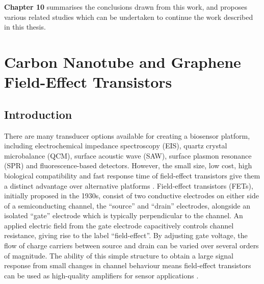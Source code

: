 \documentclass[
  a4paper,
]{scrbook}
\begin{document}
\textbf{Chapter 10} summarises the conclusions drawn from this work, and
proposes various related studies which can be undertaken to continue the
work described in this thesis.


\hypertarget{sec-thin-film-transistors}{%
\chapter{Carbon Nanotube and Graphene Field-Effect
Transistors}\label{sec-thin-film-transistors}}

\hypertarget{introduction-1}{%
\section{Introduction}\label{introduction-1}}

There are many transducer options available for creating a biosensor
platform, including electrochemical impedance spectroscopy (EIS), quartz
crystal microbalance (QCM), surface acoustic wave (SAW), surface plasmon
resonance (SPR) and fluorescence-based detectors. However, the small
size, low cost, high biological compatibility and fast response time of
field-effect transistors give them a distinct advantage over alternative
platforms \autocite{Khan2020,Shkodra2021,Hirata2021}. Field-effect
transistors (FETs), initially proposed in the 1930s, consist of two
conductive electrodes on either side of a semiconducting channel, the
``source'' and ``drain'' electrodes, alongside an isolated ``gate''
electrode which is typically perpendicular to the channel. An applied
electric field from the gate electrode capacitively controls channel
resistance, giving rise to the label ``field-effect''. By adjusting gate
voltage, the flow of charge carriers between source and drain can be
varied over several orders of magnitude. The ability of this simple
structure to obtain a large signal response from small changes in
channel behaviour means field-effect transistors can be used as
high-quality amplifiers for sensor applications
\autocite{Kauffman2008,Petti2016,Tran2016,Shkodra2021,Yao2021}.
\end{document}
